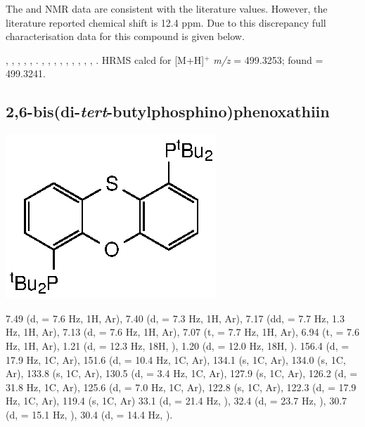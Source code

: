The \proton{} and \carbon{} NMR data are consistent with the literature values.\cite{Mispelaere2005}  However, the literature reported \phosphorus{} chemical shift is 12.4 ppm.  Due to this discrepancy full characterisation data for this compound is given below.

,
,
,
,
,
.
,
,
,
,
,
,
,
,
,
.
HRMS calcd for  [M+H]$^+$ \emph{m/z} = 499.3253; found = 499.3241.


\subsection*{2,6-bis(di-\emph{tert}-butylphosphino)phenoxathiin}

\begin{structure}[h]
\begin{center}
\includegraphics{../Structures/Transthixantphos.eps}
\end{center}
\end{structure}

7.49 (d, \J = 7.6 Hz, 1H, Ar),
7.40 (d, \J = 7.3 Hz, 1H, Ar),
7.17 (dd, \J = 7.7 Hz, 1.3 Hz, 1H, Ar),
7.13 (d, \J = 7.6 Hz, 1H, Ar),
7.07 (t, \J = 7.7 Hz, 1H, Ar),
6.94 (t, \J = 7.6 Hz, 1H, Ar),
1.21 (d, \J = 12.3 Hz, 18H, \StBuiH),
1.20 (d, \J = 12.0 Hz, 18H, \StBuiH).
156.4 (d, \JPC = 17.9 Hz, 1C, Ar),
151.6 (d, \JPC = 10.4 Hz, 1C, Ar),
134.1 (s, 1C, Ar),
134.0 (s, 1C, Ar),
133.8 (s, 1C, Ar),
130.5 (d, \JPC = 3.4 Hz, 1C, Ar),
127.9 (s, 1C, Ar),
126.2 (d, \JPC = 31.8 Hz, 1C, Ar),
125.6 (d, \JPC = 7.0 Hz, 1C, Ar),
122.8 (s, 1C, Ar),
122.3 (d, \JPC = 17.9 Hz, 1C, Ar),
119.4 (s, 1C, Ar)
33.1 (d, \JPC = 21.4 Hz, \StBuhC),
32.4 (d, \JPC = 23.7 Hz, \StBuhC),
30.7 (d, \JPC = 15.1 Hz, \StBuiC),
30.4 (d, \JPC = 14.4 Hz, \StBuiC).
 


